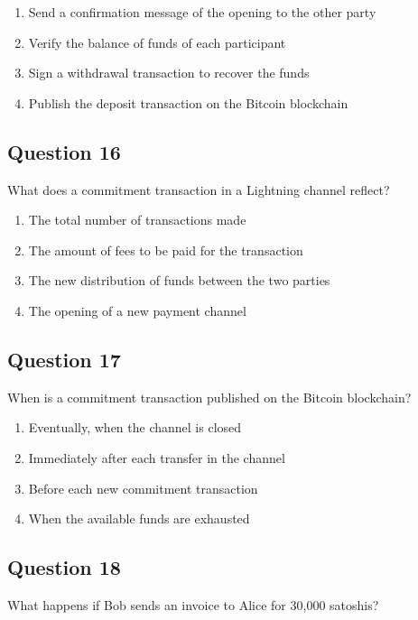 \documentclass[12pt,a4paper]{article}
\begin{document}
\begin{enumerate}[label=\Alph*., leftmargin=*]
\item Send a confirmation message of the opening to the other party
\item Verify the balance of funds of each participant
\item Sign a withdrawal transaction to recover the funds
\item Publish the deposit transaction on the Bitcoin blockchain
\end{enumerate}

\bigskip


\subsection*{Question 16}
What does a commitment transaction in a Lightning channel reflect?

\begin{enumerate}[label=\Alph*., leftmargin=*]
\item The total number of transactions made
\item The amount of fees to be paid for the transaction
\item The new distribution of funds between the two parties
\item The opening of a new payment channel
\end{enumerate}

\bigskip


\subsection*{Question 17}
When is a commitment transaction published on the Bitcoin blockchain?

\begin{enumerate}[label=\Alph*., leftmargin=*]
\item Eventually, when the channel is closed
\item Immediately after each transfer in the channel
\item Before each new commitment transaction
\item When the available funds are exhausted
\end{enumerate}

\bigskip


\subsection*{Question 18}
What happens if Bob sends an invoice to Alice for 30,000 satoshis?
\end{document}
